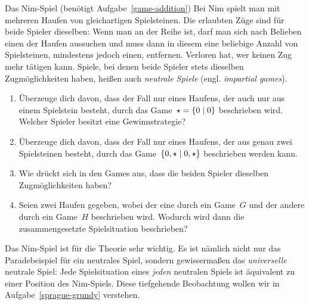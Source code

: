 \documentclass{../zirkelblatt}
\begin{document}
\begin{aufgabe}{Das Nim-Spiel (benötigt Aufgabe~\ref{game-addition})}
\label{nim}
Bei Nim spielt man mit mehreren Haufen von gleichartigen Spielsteinen. Die
erlaubten Züge sind für beide Spieler dieselben: Wenn man an der Reihe ist,
darf man sich nach Belieben einen der Haufen aussuchen und muss dann in diesem eine
beliebige Anzahl von Spielsteinen, mindestens jedoch einen, entfernen. Verloren
hat, wer keinen Zug mehr tätigen kann. Spiele, bei denen beide Spieler stets
dieselben Zugmöglichkeiten haben, heißen auch \emph{neutrale Spiele} (engl.
\emph{impartial games}).
\begin{enumerate}
\item Überzeuge dich davon, dass der Fall nur eines Haufens, der auch nur aus
einem Spielstein besteht, durch das Game~$\star = \{ 0 \mathrel{|} 0 \}$ beschrieben wird.
Welcher Spieler besitzt eine Gewinnstrategie?
\item Überzeuge dich davon, dass der Fall nur eines Haufens, der aus genau zwei
Spielsteinen besteht, durch das Game~$\{ 0,\star \mathrel{|} 0,\star \}$ beschrieben
werden kann.
\item Wie drückt sich in den Games aus, dass die beiden Spieler dieselben
Zugmöglichkeiten haben?
\item Seien zwei Haufen gegeben, wobei der eine durch ein Game~$G$ und der
andere durch ein Game~$H$ beschrieben wird. Wodurch wird dann die
zusammengesetzte Spielsituation beschrieben?
\end{enumerate}
Das Nim-Spiel ist für die Theorie sehr wichtig. Es ist nämlich nicht nur das
Paradebeispiel für ein neutrales Spiel, sondern gewissermaßen das
\emph{universelle} neutrale Spiel: Jede Spielsituation eines \emph{jeden}
neutralen Spiels ist äquivalent zu einer Position des Nim-Spiels. Diese
tiefgehende Beobachtung wollen wir in Aufgabe~\ref{sprague-grundy} verstehen.
\end{aufgabe}
\end{document}
